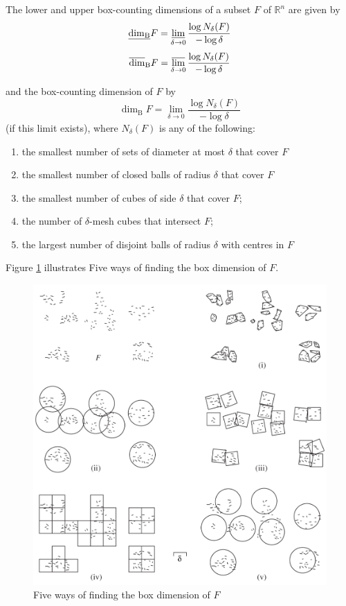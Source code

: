 \begin{definition}\label{bcd-def}
    The lower and upper box-counting dimensions of a subset $F$ of $\mathbb{R}^{n}$ are given by
    $$\underline{\operatorname{dim}_{\mathrm{B}}} F=\varliminf_{\delta \rightarrow 0} \frac{\log N_{\delta}(F)}{-\log \delta}$$
    $$\overline{\operatorname{dim}}_{\mathrm{B}} F=\varlimsup_{\delta \rightarrow 0} \frac{\log N_{\delta}(F)}{-\log \delta}$$
    
and the box-counting dimension of $F$ by
$$
\operatorname{dim}_{\mathrm{B}} F=\lim _{\delta \rightarrow 0} \frac{\log N_{\delta}(F)}{-\log \delta}
$$
(if this limit exists), where $N_{\delta}(F)$ is any of the following:
\begin{enumerate}[i]
    \item the smallest number of sets of diameter at most $\delta$ that cover $F$
    \item  the smallest number of closed balls of radius $\delta$ that cover $F$
    \item  the smallest number of cubes of side $\delta$ that cover $F$;
    \item  the number of $\delta$-mesh cubes that intersect $F$;
    \item  the largest number of disjoint balls of radius $\delta$ with centres in $F$  
\end{enumerate}  
Figure \ref{fig:bcd-def-vis} illustrates Five ways of finding the box dimension of $F$.

\end{definition}


\begin{figure}[t]
    \centering
    \includegraphics[width=.66\textwidth]{images/bcd-def-vis.png}
    \caption{Five ways of finding the box dimension of $F$}
    \label{fig:bcd-def-vis}
\end{figure}


